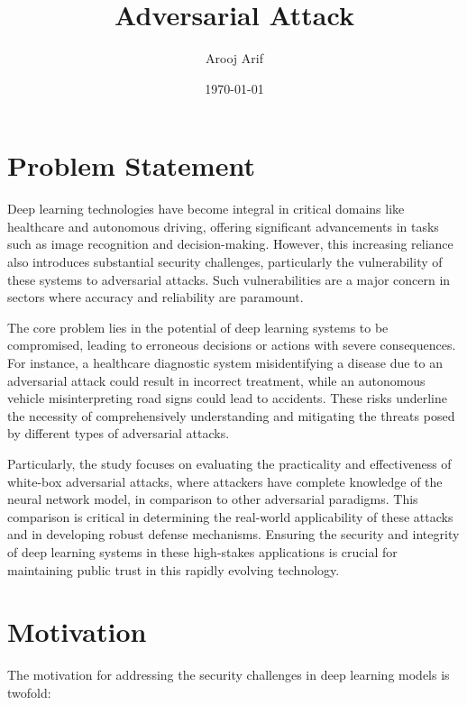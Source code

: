 \documentclass[10pt, conference, a4paper, final]{IEEEtran}
\title{Adversarial Attack}
\author{Arooj Arif}
\date{\today} %
\begin{document}
\maketitle %

\section{Problem Statement}

Deep learning technologies have become integral in critical domains like healthcare and autonomous driving, offering significant advancements in tasks such as image recognition and decision-making. However, this increasing reliance also introduces substantial security challenges, particularly the vulnerability of these systems to adversarial attacks. Such vulnerabilities are a major concern in sectors where accuracy and reliability are paramount.

The core problem lies in the potential of deep learning systems to be compromised, leading to erroneous decisions or actions with severe consequences. For instance, a healthcare diagnostic system misidentifying a disease due to an adversarial attack could result in incorrect treatment, while an autonomous vehicle misinterpreting road signs could lead to accidents. These risks underline the necessity of comprehensively understanding and mitigating the threats posed by different types of adversarial attacks.

Particularly, the study focuses on evaluating the practicality and effectiveness of white-box adversarial attacks, where attackers have complete knowledge of the neural network model, in comparison to other adversarial paradigms. This comparison is critical in determining the real-world applicability of these attacks and in developing robust defense mechanisms. Ensuring the security and integrity of deep learning systems in these high-stakes applications is crucial for maintaining public trust in this rapidly evolving technology.

\section{Motivation}

The motivation for addressing the security challenges in deep learning models is twofold:
\end{document}
